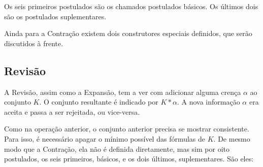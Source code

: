 Os seis primeiros postulados são os chamados postulados básicos. Os últimos dois são os postulados suplementares.

Ainda para a Contração existem dois construtores especiais definidos, que serão discutidos à frente.

\subsection{Revisão}

A Revisão, assim como a Expansão, tem a ver com adicionar alguma crença $ \alpha $ ao conjunto $ K $. O conjunto resultante é indicado por $ K \ast \alpha $. A nova informação $ \alpha $ era aceita e passa a ser rejeitada, ou vice-versa.

Como na operação anterior, o conjunto anterior precisa se mostrar consistente. Para isso, é necessário apagar o mínimo possível das fórmulas de $ K $. De mesmo modo que a Contração, ela não é definida diretamente, mas sim por oito postulados, os seis primeiros, básicos, e os dois últimos, suplementares. São eles:

